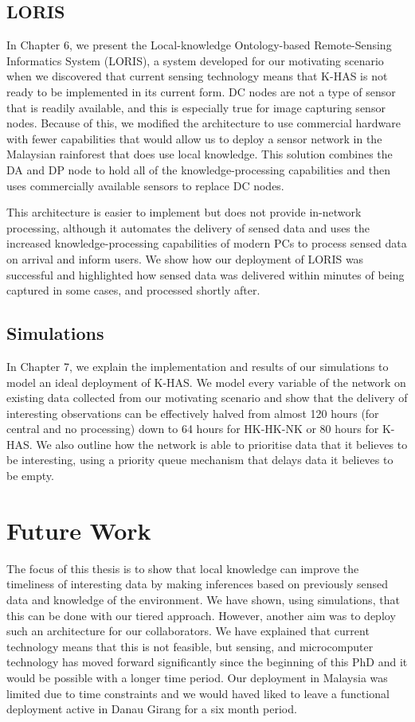 \subsection{LORIS}
In Chapter 6, we present the Local-knowledge Ontology-based Remote-Sensing Informatics System (LORIS), a system developed for our motivating scenario when we discovered that current sensing technology means that K-HAS is not ready to be implemented in its current form. DC nodes are not a type of sensor that is readily available, and this is especially true for image capturing sensor nodes. Because of this, we modified the architecture to use commercial hardware with fewer capabilities that would allow us to deploy a sensor network in the Malaysian rainforest that does use local knowledge. This solution combines the DA and DP node to hold all of the knowledge-processing capabilities and then uses commercially available sensors to replace DC nodes. 

This architecture is easier to implement but does not provide in-network processing, although it automates the delivery of sensed data and uses the increased knowledge-processing capabilities of modern PCs to process sensed data on arrival and inform users. We show how our deployment of LORIS was successful and highlighted how sensed data was delivered within minutes of being captured in some cases, and processed shortly after. 
\subsection{Simulations}
In Chapter 7, we explain the implementation and results of our simulations to model an ideal deployment of K-HAS. We model every variable of the network on existing data collected from our motivating scenario and show that the delivery of interesting observations can be effectively halved from almost 120 hours (for central and no processing) down to 64 hours for HK-HK-NK or 80 hours for K-HAS.
We also outline how the network is able to prioritise data that it believes to be interesting, using a priority queue mechanism that delays data it believes to be empty. 

\section{Future Work}
The focus of this thesis is to show that local knowledge can improve the timeliness of interesting data by making inferences based on previously sensed data and knowledge of the environment. We have shown, using simulations, that this can be done with our tiered approach. However, another aim was to deploy such an architecture for our collaborators. We have explained that current technology means that this is not feasible, but sensing, and microcomputer technology has moved forward significantly since the beginning of this PhD and it would be possible with a longer time period. Our deployment in Malaysia was limited due to time constraints and we would haved liked to leave a functional deployment active in Danau Girang for a six month period. 

